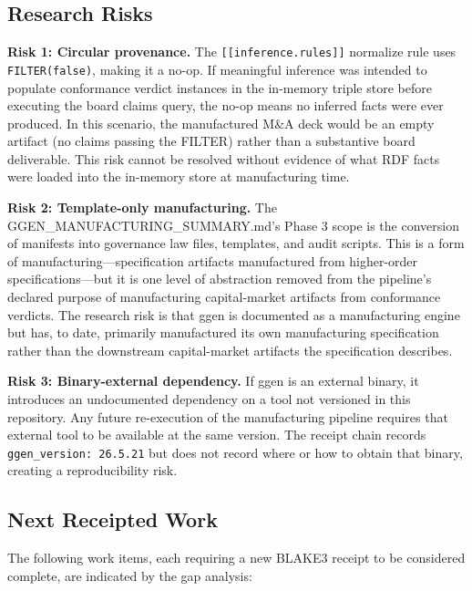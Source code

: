 \subsection{Research Risks}
\label{sec:ggen-open-questions-risks}

\textbf{Risk 1: Circular provenance.} The \texttt{[[inference.rules]]} normalize rule uses
\texttt{FILTER(false)}, making it a no-op. If meaningful inference was intended to populate
conformance verdict instances in the in-memory triple store before executing the board claims
query, the no-op means no inferred facts were ever produced. In this scenario, the manufactured
M\&A deck would be an empty artifact (no claims passing the FILTER) rather than a substantive
board deliverable. This risk cannot be resolved without evidence of what RDF facts were loaded
into the in-memory store at manufacturing time.

\textbf{Risk 2: Template-only manufacturing.} The GGEN\_MANUFACTURING\_SUMMARY.md's Phase 3
scope is the conversion of manifests into governance law files, templates, and audit scripts.
This is a form of manufacturing---specification artifacts manufactured from higher-order
specifications---but it is one level of abstraction removed from the pipeline's declared purpose
of manufacturing capital-market artifacts from conformance verdicts. The research risk is that
ggen is documented as a manufacturing engine but has, to date, primarily manufactured its own
manufacturing specification rather than the downstream capital-market artifacts the specification
describes.

\textbf{Risk 3: Binary-external dependency.} If ggen is an external binary, it introduces an
undocumented dependency on a tool not versioned in this repository. Any future re-execution of
the manufacturing pipeline requires that external tool to be available at the same version. The
receipt chain records \texttt{ggen\_version: 26.5.21} but does not record where or how to obtain
that binary, creating a reproducibility risk.

\subsection{Next Receipted Work}
\label{sec:ggen-open-questions-next}

The following work items, each requiring a new BLAKE3 receipt to be considered complete, are
indicated by the gap analysis:

